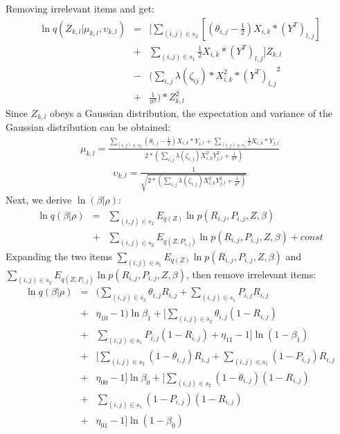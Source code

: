 \documentclass[journal]{IEEEtran}
\begin{document}
Removing irrelevant items and get:
\begin{eqnarray*}
    \ln q(Z_{k,l}|\mu_{k,l},\upsilon_{k,l})&=&[\sum_{(i,j)\in s_2}[(\theta_{i,j}-\frac{1}{2})X_{i,k}*(Y^{T})_{l,j}]\\
    &+& \sum_{(i,j)\in s_1}\frac{1}{2}X_{i,k}*(Y^{T})_{l,j}]Z_{k,l}\\
    &-&(\sum_{i,j}\lambda(\zeta_{ij})*X^{2}_{i,k}*{(Y^{T})_{l,j}}^{2} \\
    &+&\frac{1}{\sigma^{2}})*Z^{2}_{k,l}
\end{eqnarray*}
Since $Z_{k,l}$ obeys a Gaussian distribution, the expectation and variance of the Gaussian distribution can be obtained:
\begin{eqnarray*}
\mu_{k,l} = \frac{\sum_{(i,j)\in s_2}(\theta_{i,j}-\frac{1}{2})X_{i,k}*Y_{j,l}+\sum_{(i,j)\in s_1}\frac{1}{2}X_{i,k}*Y_{j,l}}{2*(\sum_{i,j}\lambda(\zeta_{i,j})X^{2}_{i,k}Y_{j,l}^{2}+\frac{1}{\sigma^2})}
\end{eqnarray*}
\begin{eqnarray*}
\upsilon_{k,l} = \frac{1}{\sqrt{2*(\sum_{i,j}\lambda(\zeta_{i,j})X^{2}_{i,k}Y_{j,l}^{2}+\frac{1}{\sigma^2})}}
\end{eqnarray*}
Next, we derive $\ln(\beta|\rho)$:
\begin{eqnarray*}
    \ln q(\beta|\rho) 
    &=& \sum_{(i,j)\in s_1}E_{q(Z)}{\ln p(R_{i,j},P_{i,j},Z,\beta)}  \nonumber \\ 
    &+& \sum_{(i,j)\in s_2}E_{q(Z,P_{i,j})}{\ln p(R_{i,j},P_{i,j},Z,\beta)} + const
\end{eqnarray*}
Expanding the two items $\sum_{(i,j)\in s_1}E_{q(Z)}{\ln p(R_{i,j},P_{i,j},Z,\beta)}$ and $\sum_{(i,j)\in s_2}E_{q(Z,P_{i,j})}{\ln p(R_{i,j},P_{i,j},Z,\beta)}$, then remove irrelevant items: 
\begin{eqnarray*}
    \ln q(\beta|\rho) &=& (\sum_{(i,j)\in s_2}\theta _{i,j}R_{i,j} + \sum_{(i,j)\in s_1}P_{i,j}R_{i,j} \\
    &+&\eta_{10}-1)\ln{\beta_{1}}+[\sum_{(i,j)\in s_2}\theta_{i,j} (1-R_{i,j}) \\
    &+& \sum_{(i,j)\in s_1}P_{i,j}(1-R_{i,j})+\eta_{11}-1]\ln(1-\beta_{1}) \\
    &+&[\sum_{(i,j)\in s_2}(1-\theta_{i,j})R_{i,j} + \sum_{(i,j)\in s_1}(1-P_{i,j})R_{i,j} \\ 
    &+&\eta_{00}-1]\ln{\beta_0} +[\sum_{(i,j)\in s_2}(1-\theta_{i,j})(1-R_{i,j}) \\ 
    &+& \sum_{(i,j)\in s_1}(1-P_{i,j})(1-R_{i,j}) \\
    &+&\eta_{01}-1]\ln(1-\beta_{0})
\end{eqnarray*}
\end{document}

